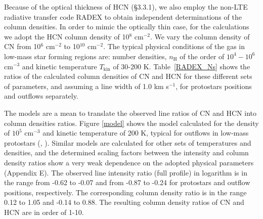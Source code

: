 \documentclass{aa}
\begin{document}
Because of the optical thickness of HCN (\S 3.3.1), we also employ the non-LTE radiative transfer code RADEX 
to obtain independent determinations of the column densities. In order to mimic the optically thin case,
for the calculations we adopt the HCN column density of 10$^8$ cm$^{-2}$. We vary the column density 
of CN from 10$^6$ cm$^{-2}$ to 10$^{10}$ cm$^{-2}$. The typical physical conditions of the gas 
in low-mass star forming regions are: number densities, $n_\mathrm{H}$ of the order of \textbf{$10^{4}-10^{6}$} cm$^{-3}$ 
and kinetic temperature $T_\mathrm{kin}$ of 30-200 K. Table~\ref{RADEX_Ns} shows the ratios of the calculated 
column densities of CN and HCN for these different sets of parameters, and assuming a line width of 1.0 km s$^{-1}$, for protostars positions and outflows separately.

The models are a mean to translate the observed line ratios of CN and HCN into column densities ratios. 
Figure \ref{model} shows the model calculated for the density of $10^{5}$ cm$^{-3}$ and kinetic temperature 
of 200 K, typical for outflows in low-mass protostars (\citealt{vKe09}, \citealt{Yil15}). Similar models are calculated for other sets of 
temperatures and densities, and the determined scaling factors between the intensity and column
density ratios show a very weak dependence on the adopted physical parameters (Appendix E). The observed line intensity ratio (full profile) 
in logarithm is in the range from -0.62 to -0.07 and from -0.87 to -0.24 for protostars and outflow positions, respectively.
 The corresponding column density ratio is
in the range 0.12 to 1.05 and -0.14 to 0.88. The resulting 
column density ratios of CN and HCN are in order of 1-10.


\end{document}
